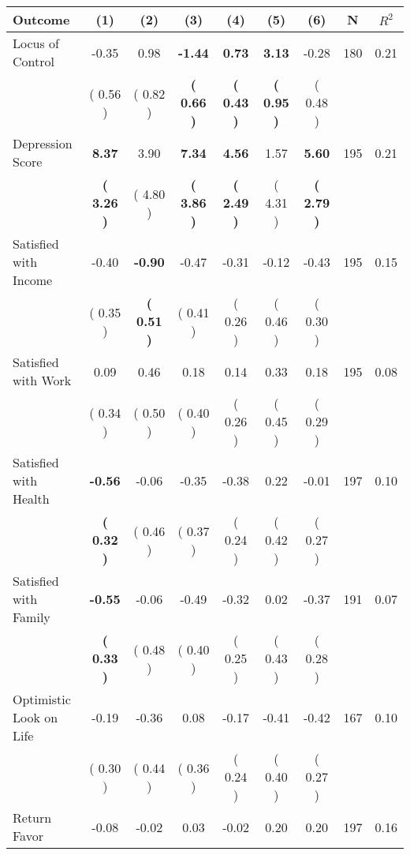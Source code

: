 \begin{tabular}{lcccccccc}
\toprule
 \textbf{Outcome} & \textbf{(1)} & \textbf{(2)} & \textbf{(3)} & \textbf{(4)} & \textbf{(5)} & \textbf{(6)} & \textbf{N} & \textbf{$ R^2$} \\
\midrule
Locus of Control &     -0.35 &      0.98 & \textbf{    -1.44} & \textbf{     0.73} & \textbf{     3.13} &     -0.28 & 180 &       0.21 \\ 
 & (     0.56 ) & (     0.82 ) & \textbf{(     0.66 )} & \textbf{(     0.43 )} & \textbf{(     0.95 )} & (     0.48 ) & \\
Depression Score & \textbf{     8.37} &      3.90 & \textbf{     7.34} & \textbf{     4.56} &      1.57 & \textbf{     5.60} & 195 &       0.21 \\ 
 & \textbf{(     3.26 )} & (     4.80 ) & \textbf{(     3.86 )} & \textbf{(     2.49 )} & (     4.31 ) & \textbf{(     2.79 )} & \\
Satisfied with Income &     -0.40 & \textbf{    -0.90} &     -0.47 &     -0.31 &     -0.12 &     -0.43 & 195 &       0.15 \\ 
 & (     0.35 ) & \textbf{(     0.51 )} & (     0.41 ) & (     0.26 ) & (     0.46 ) & (     0.30 ) & \\
Satisfied with Work &      0.09 &      0.46 &      0.18 &      0.14 &      0.33 &      0.18 & 195 &       0.08 \\ 
 & (     0.34 ) & (     0.50 ) & (     0.40 ) & (     0.26 ) & (     0.45 ) & (     0.29 ) & \\
Satisfied with Health & \textbf{    -0.56} &     -0.06 &     -0.35 &     -0.38 &      0.22 &     -0.01 & 197 &       0.10 \\ 
 & \textbf{(     0.32 )} & (     0.46 ) & (     0.37 ) & (     0.24 ) & (     0.42 ) & (     0.27 ) & \\
Satisfied with Family & \textbf{    -0.55} &     -0.06 &     -0.49 &     -0.32 &      0.02 &     -0.37 & 191 &       0.07 \\ 
 & \textbf{(     0.33 )} & (     0.48 ) & (     0.40 ) & (     0.25 ) & (     0.43 ) & (     0.28 ) & \\
Optimistic Look on Life &     -0.19 &     -0.36 &      0.08 &     -0.17 &     -0.41 &     -0.42 & 167 &       0.10 \\ 
 & (     0.30 ) & (     0.44 ) & (     0.36 ) & (     0.24 ) & (     0.40 ) & (     0.27 ) & \\
Return Favor &     -0.08 &     -0.02 &      0.03 &     -0.02 &      0.20 &      0.20 & 197 &       0.16 \\ 

\end{tabular}
